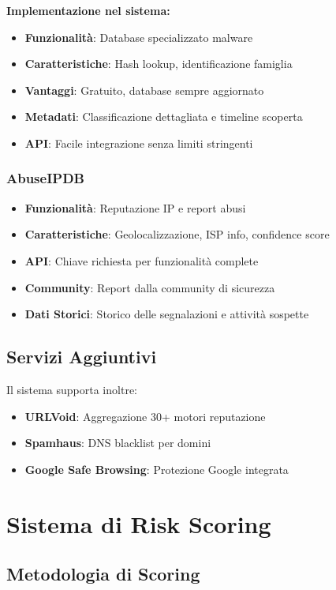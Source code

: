 \documentclass{article}
\begin{document}
\textbf{Implementazione nel sistema:}
\begin{itemize}
    \item \textbf{Funzionalità}: Database specializzato malware
    \item \textbf{Caratteristiche}: Hash lookup, identificazione famiglia
    \item \textbf{Vantaggi}: Gratuito, database sempre aggiornato
    \item \textbf{Metadati}: Classificazione dettagliata e timeline scoperta
    \item \textbf{API}: Facile integrazione senza limiti stringenti
\end{itemize}

\subsubsection{AbuseIPDB}
\begin{itemize}
    \item \textbf{Funzionalità}: Reputazione IP e report abusi
    \item \textbf{Caratteristiche}: Geolocalizzazione, ISP info, confidence score
    \item \textbf{API}: Chiave richiesta per funzionalità complete
    \item \textbf{Community}: Report dalla community di sicurezza
    \item \textbf{Dati Storici}: Storico delle segnalazioni e attività sospette
\end{itemize}

\subsection{Servizi Aggiuntivi}

Il sistema supporta inoltre:
\begin{itemize}
    \item \textbf{URLVoid}: Aggregazione 30+ motori reputazione
    \item \textbf{Spamhaus}: DNS blacklist per domini
    \item \textbf{Google Safe Browsing}: Protezione Google integrata
\end{itemize}

\section{Sistema di Risk Scoring}

\subsection{Metodologia di Scoring}
\end{document}
